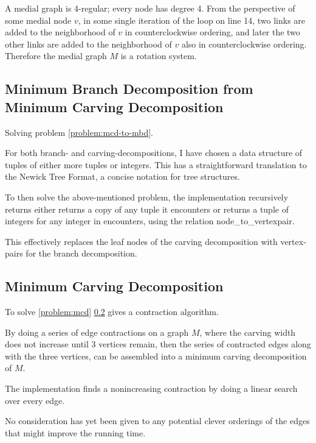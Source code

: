 \documentclass{article}
\begin{document}
		A medial graph is 4-regular; every node has degree 4. From the perspective of some medial node $v$, in some single iteration of the loop on line 14, two links are added to the neighborhood of $v$ in counterclockwise ordering, and later the two other links are added to the neighborhood of $v$ also in counterclockwise ordering. Therefore the medial graph $M$ is a rotation system.

	
	\subsection{Minimum Branch Decomposition from Minimum Carving Decomposition}

		Solving problem \ref{problem:mcd-to-mbd}.

		For both branch- and carving-decompositions, I have chosen a data structure of tuples of either more tuples or integers. This has a straightforward translation to the Newick Tree Format, a concise notation for tree structures.

		To then solve the above-mentioned problem, the implementation recursively returns either returns a copy of any tuple it encounters or returns a tuple of integers for any integer in encounters, using the relation node\_to\_vertexpair.

		This effectively replaces the leaf nodes of the carving decomposition with vertex-pairs for the branch decomposition.

			
	\subsection{Minimum Carving Decomposition}

		To solve \ref{problem:mcd} \ref{} gives a contraction algorithm.

		By doing a series of edge contractions on a graph $M$, where the carving width does not increase until 3 vertices remain, then the series of contracted edges along with the three vertices, can be assembled into a minimum carving decomposition of $M$.

		The implementation finds a nonincreasing contraction by doing a linear search over every edge.
		
		No consideration has yet been given to any potential clever orderings of the edges that might improve the running time.
\end{document}
